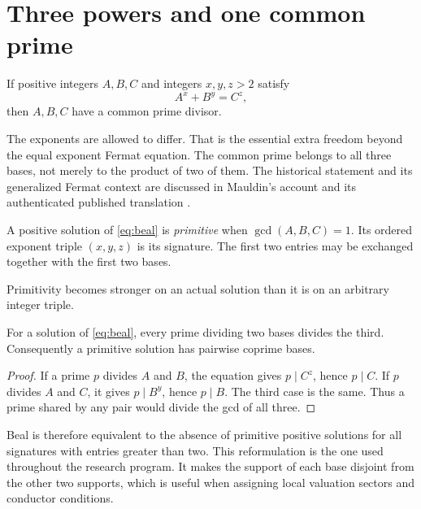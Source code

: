 \section{Three powers and one common prime}\label{sec:statement}
\begin{conjecture}[Beal]\label{conj:beal}
If positive integers $A,B,C$ and integers $x,y,z>2$ satisfy
\begin{equation}\label{eq:beal}
A^x+B^y=C^z,
\end{equation}
then $A,B,C$ have a common prime divisor.
\end{conjecture}
The exponents are allowed to differ. That is the essential extra freedom beyond the equal exponent Fermat equation. The common prime belongs to all three bases, not merely to the product of two of them. The historical statement and its generalized Fermat context are discussed in Mauldin's account and its authenticated published translation \cite{mauldin1997,mauldin1998translation}.

\begin{definition}
A positive solution of \eqref{eq:beal} is \emph{primitive} when $\gcd(A,B,C)=1$. Its ordered exponent triple $(x,y,z)$ is its signature. The first two entries may be exchanged together with the first two bases.
\end{definition}
Primitivity becomes stronger on an actual solution than it is on an arbitrary integer triple.
\begin{lemma}\label{lem:pairwise}
For a solution of \eqref{eq:beal}, every prime dividing two bases divides the third. Consequently a primitive solution has pairwise coprime bases.
\end{lemma}
\begin{proof}
If a prime $p$ divides $A$ and $B$, the equation gives $p\mid C^z$, hence $p\mid C$. If $p$ divides $A$ and $C$, it gives $p\mid B^y$, hence $p\mid B$. The third case is the same. Thus a prime shared by any pair would divide the gcd of all three.
\end{proof}
Beal is therefore equivalent to the absence of primitive positive solutions for all signatures with entries greater than two. This reformulation is the one used throughout the research program. It makes the support of each base disjoint from the other two supports, which is useful when assigning local valuation sectors and conductor conditions.

